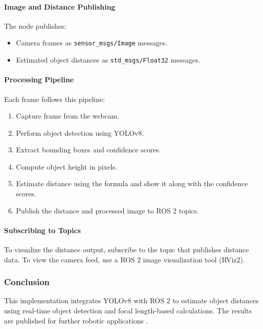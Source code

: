 \documentclass[english,project]{buwthesis}
\begin{document}
\paragraph{Image and Distance Publishing}
The node publishes:
\begin{itemize}
    \item Camera frames as \texttt{sensor\_msgs/Image} messages.
    \item Estimated object distances as \texttt{std\_msgs/Float32} messages.
\end{itemize}

\paragraph{Processing Pipeline}
Each frame follows this pipeline:
\begin{enumerate}
    \item Capture frame from the webcam.
    \item Perform object detection using YOLOv8.
    \item Extract bounding boxes and confidence scores.
    \item Compute object height in pixels.
    \item Estimate distance using the formula and show it along with the confidence scores.
    \item Publish the distance and processed image to ROS 2 topics.
\end{enumerate}


\paragraph{Subscribing to Topics}
To visualize the distance output, subscribe to the topic that publishes distance data. To view the camera feed, use a ROS 2 image visualization tool (RViz2).

\subsubsection{Conclusion}
This implementation integrates YOLOv8 with ROS 2 to estimate object distances using real-time object detection and focal length-based calculations. The results are published for further robotic applications .
\end{document}
